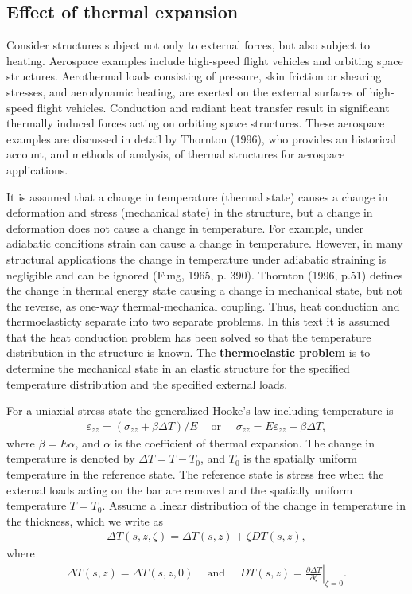 \documentclass{AeroStructure-ERJohnson}
\begin{document}
\subsection{Effect of thermal expansion}\label{sec3.7.1}

Consider structures subject not only to external forces, but also subject to heating. Aerospace examples include high-speed flight vehicles and orbiting space structures. Aerothermal loads consisting of pressure, skin friction or shearing stresses, and aerodynamic heating, are exerted on the external surfaces of high-speed flight vehicles. Conduction and radiant heat transfer result in significant thermally induced forces acting on orbiting space structures. These aerospace examples are discussed in detail by Thornton (1996), who provides an historical account, and methods of analysis, of thermal structures for aerospace applications.

It is assumed that a change in temperature (thermal state) causes a change in deformation and stress (mechanical state) in the structure, but a change in deformation does not cause a change in temperature. For example, under adiabatic conditions strain can cause a change in temperature. However, in many structural applications the change in temperature under adiabatic straining is negligible and can be ignored (Fung, 1965, p. 390). Thornton (1996, p.51) defines the change in thermal energy state causing a change in mechanical state, but not the reverse, as one-way thermal-mechanical coupling. Thus, heat conduction and thermoelasticty separate into two separate problems. In this text it is assumed that the heat conduction problem has been solved so that the temperature distribution in the structure is known. The \textbf{thermoelastic problem} is to determine the mechanical state in an elastic structure for the specified temperature distribution and the specified external loads.

For a uniaxial stress state the generalized Hooke's law including temperature is
\begin{align}\label{eq3.65}
\varepsilon_{z z}=\left(\sigma_{z z}+\beta \Delta T\right) / E \quad~\text{or } \quad \sigma_{z z}=E \varepsilon_{z z}-\beta \Delta T,
\end{align}
where $\beta=E \alpha$, and $\alpha$ is the coefficient of thermal expansion. The change in temperature is denoted by $\Delta T=T-T_{0}$, and $T_{0}$ is the spatially uniform temperature in the reference state. The reference state is stress free when the external loads acting on the bar are removed and the spatially uniform temperature $T=T_{0}$. Assume a linear distribution of the change in temperature in the thickness, which we write as
\begin{align}\label{eq3.66}
\Delta T(s, z, \zeta)=\Delta T(s, z)+\zeta D T(s, z),
\end{align}
where
\begin{align}\label{eq3.67}
\Delta T(s, z)=\Delta T(s, z, 0) \quad~\text{and } \quad D T(s, z)=\left.\frac{\partial \Delta T}{\partial \zeta}\right|_{\zeta=0}.
\end{align}
\end{document}
